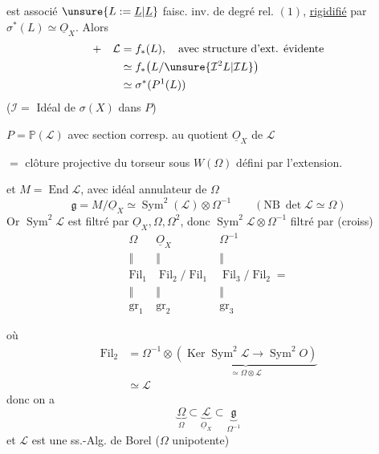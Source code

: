  est associé $\unsure{L:=\underline L|\underline L}$
faisc. inv. de degré rel. $(1)$,
\uline{rigidifié} par $\sigma^*(L)\simeq\underline O_X$. Alors
\[
\begin{aligned}
+\quad\mathcal L&=f_*(L),\quad\text{avec structure d'ext. évidente}\\
&\simeq f_*\bigl(L/\unsure{\mathcal I^2L|\mathcal IL}\bigr)\\
&\simeq\sigma^*(P^1(L))
\end{aligned}
\]
($\mathcal I=$ Idéal de $\sigma(X)$ dans $P$)

$P=\mathbb P(\mathcal L)$ avec section corresp. au quotient
$\underline O_X$ de $\mathcal L$

$=$ clôture projective du torseur sous $W(\Omega)$ défini par l'extension.

et $M=\operatorname{End}\mathcal L$, avec idéal annulateur de $\Omega$
\[
\mathfrak g=M/\underline O_X\simeq\operatorname{Sym}^2(\mathcal L)
\otimes\Omega^{-1}\qquad(\mathrm{NB}\ \det\mathcal L\simeq\Omega)
\]
Or $\operatorname{Sym}^2\mathcal L$ est filtré par
 $\underline O_X,\Omega,\Omega^2$,
donc $\operatorname{Sym}^2\mathcal L\otimes\Omega^{-1}$ filtré par (croiss)
\[
\begin{array}{ccc}
\Omega&\underline O_X&\Omega^{-1}\\
\Vert&\Vert&\Vert\\
\operatorname{Fil}_1&\operatorname{Fil}_2/\operatorname{Fil}_1
&\operatorname{Fil}_3/\operatorname{Fil}_2=\\
\Vert&\Vert&\Vert\\
\operatorname{gr}_1&\operatorname{gr}_2&\operatorname{gr}_3
\end{array}
\]

où
\[
\begin{aligned}
\operatorname{Fil}_2
&=\Omega^{-1}\otimes
\underbrace{(\operatorname{Ker}\operatorname{Sym}^2\mathcal L
\longrightarrow\operatorname{Sym}^2 O)}_{\simeq\Omega\otimes\mathcal L}\\
&\simeq\mathcal L
\end{aligned}
\]
donc on a
\[
\underset{\Omega}{\underbrace{\Omega}}\subset
\underset{\underline O_X}{\underbrace{\mathcal L}}\subset
\underset{\Omega^{-1}}{\underbrace{\mathfrak g}}
\]
et $\mathcal L$ est une ss.-Alg. de Borel
($\Omega$  unipotente)


